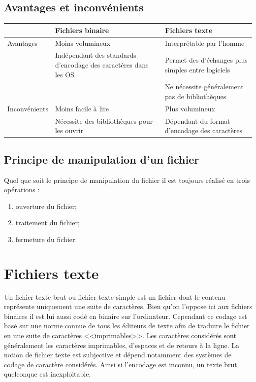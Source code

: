 \documentclass[10pt,fleqn]{article} %
\begin{document}
\subsection{Avantages et inconvénients}
\begin{center}
\begin{tabular}{|p{2.5cm}|p{6.5cm}|p{8cm}|}
\cline{2-3}
\multicolumn{1}{c|}{} & Fichiers binaire& Fichiers texte\\
 \hline
Avantages &  Moins volumineux & Interprétable par l'homme\\

		  & Indépendant des standards d'encodage des caractères dans les OS &Permet des d'échanges plus simples entre logiciels\\
		  & & Ne nécessite généralement pas de bibliothèques\\
\hline
Inconvénients & Moins facile à lire & Plus volumineux\\

			& Nécessite des bibliothèques pour les ouvrir &Dépendant du format d'encodage des caractères\\
			\hline
\end{tabular}
\end{center}

\subsection{Principe de manipulation d'un fichier}

Quel que soit le principe de manipulation du fichier il est toujours réalisé en trois opérations :
\begin{enumerate}
\item ouverture du fichier;
\item traitement du fichier;
\item fermeture du fichier.
\end{enumerate}


\section{Fichiers texte}


Un fichier texte brut ou fichier texte simple est un fichier dont le contenu représente uniquement une suite de caractères.
Bien qu'on l'oppose ici aux fichiers binaires il est lui aussi codé en binaire sur l'ordinateur. Cependant ce codage est basé sur une norme connue de tous les éditeurs de texte afin de traduire le fichier en une suite de caractères <<imprimables>>.
Les caractères considérés sont généralement les caractères imprimables, d'espaces et de retours à la ligne. La notion de fichier texte est subjective et dépend notamment des systèmes de codage de caractère considérés. Ainsi si l'encodage est inconnu, un texte brut quelconque est inexploitable.
\end{document}
